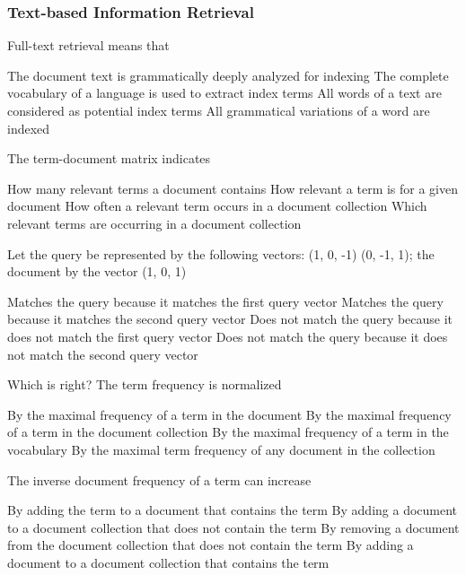 \documentclass[12pt,a4paper]{exam} %
\begin{document}
\subsubsection{Text-based Information Retrieval}
\begin{questions}
\question Full-text retrieval means that
\begin{checkboxes}
\choice The document text is grammatically deeply analyzed for indexing
\choice The complete vocabulary of a language is used to extract index terms
\CorrectChoice All words of a text are considered as potential index terms
\choice All grammatical variations of a word are indexed
\end{checkboxes}

\question The term-document matrix indicates
\begin{checkboxes}
\CorrectChoice How many relevant terms a document contains
\choice How relevant a term is for a given document
\CorrectChoice How often a relevant term occurs in a document collection
\CorrectChoice Which relevant terms are occurring in a document collection
\end{checkboxes}

\question Let the query be represented by the following vectors:
(1, 0, -1) (0, -1, 1); the document by the vector (1, 0, 1)
\begin{checkboxes}
\choice Matches the query because it matches the first query vector
\CorrectChoice Matches the query because it matches the second query vector
\choice Does not match the query because it does not match the first query vector
\choice Does not match the query because it does not match the second query vector
\end{checkboxes}

\question Which is right? The term frequency is normalized
\begin{checkboxes}
\CorrectChoice By the maximal frequency of a term in the document
\choice By the maximal frequency of a term in the document collection
\choice By the maximal frequency of a term in the vocabulary
\choice By the maximal term frequency of any document in the collection
\end{checkboxes}


\question The inverse document frequency of a term can increase
\begin{checkboxes}
\choice By adding the term to a document that contains the term
\CorrectChoice By adding a document to a document collection that does not
contain the term
\choice By removing a document from the document collection that
does not contain the term
\choice By adding a document to a document collection that contains
the term
\end{checkboxes}

\end{questions}
\end{document}
